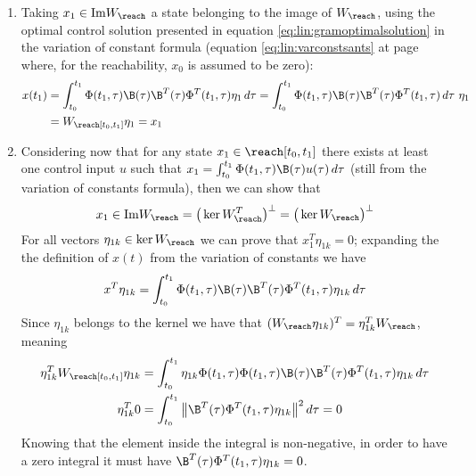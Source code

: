 	\begin{enumerate}[\itshape i)]
		\item Taking $x_1 \in \textrm{Im} W_\reach$ a state belonging to the image of $W_\reach$, using the optimal control solution presented in equation \ref{eq:lin:gramoptimalsolution} in the variation of constant formula (equation \ref{eq:lin:varconstsants} at page \pageref{eq:lin:varconstsants} where, for the reachability, $x_0$ is assumed to be zero):
		\begin{align*}
			x(t_1) & = \int_{t_0}^{t_1} \Phi(t_1,\tau) \B(\tau) \B^T(\tau) \Phi^T(t_1,\tau) \eta_1 \, d\tau = \int_{t_0}^{t_1} \Phi(t_1,\tau) \B(\tau) \B^T(\tau) \Phi^T(t_1,\tau) \, d\tau \  \eta_1 \\
			& = W_\reach[t_0,t_1] \eta_1 = x_1
		\end{align*}
	
		\item Considering now that for any state $x_1 \in \reach[t_0,t_1]$ there exists at least one control input $u$ such that $x_1 = \int_{t_0}^{t_1} \Phi(t_1,\tau) \B(\tau) u(\tau) \, d\tau$ (still from the variation of constants formula), then we can show that
		\[ x_1 \in \textrm{Im} W_\reach = \big( \ker W_\reach^T \big)^\perp = \big(
		 \ker W_\reach \big)^\perp \]
		For all vectors $\eta_{1k} \in \ker W_\reach$ we can prove that $x_1^T \eta_{1k} = 0$; expanding the the definition of $x(t)$ from the variation of constants we have
		\[ x^T \eta_{1k} = \int_{t_0}^{t_1} \Phi(t_1,\tau) \B(\tau) \B^T(\tau) \Phi^T(t_1,\tau) \eta_{1k} \, d\tau \]
		Since $\eta_{1k}$ belongs to the kernel we have that $( W_\reach \eta_{1k} )^T = \eta_{1k}^T W_\reach$, meaning
		\begin{align*}
			\eta_{1k}^T W_\reach[t_0,t_1] \eta_{1k} & = \int_{t_0}^{t_1} \eta_{1k} \Phi(t_1,\tau)\Phi(t_1,\tau) \B(\tau) \B^T(\tau) \Phi^T(t_1,\tau) \eta_{1k} \, d\tau  \\
			\eta_{1k}^T 0 & = \int_{t_0}^{t_1} \big\| \B^T(\tau) \Phi^T(t_1,\tau) \eta_{1k} \big\|^2 \, d\tau = 0			
		\end{align*}
		Knowing that the element inside the integral is non-negative, in order to have a zero integral it must have $\B^T(\tau) \Phi^T(t_1,\tau) \eta_{1k} = 0$.
	\end{enumerate}
	

